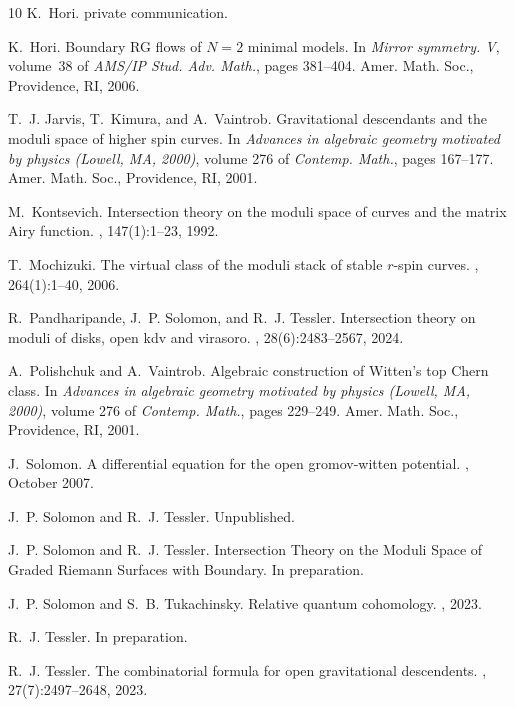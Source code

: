 \documentclass[11pt]{amsart}
\theoremstyle{definition}
\theoremstyle{remark}
\newcommand{\<}{\left<}
\renewcommand{\>}{\right>}
\numberwithin{equation}{section}
\begin{document}
\begin{thebibliography}{10}
K.~Hori.
\newblock private communication.

K.~Hori.
\newblock Boundary {RG} flows of {$N=2$} minimal models.
\newblock In {\em Mirror symmetry. {V}}, volume~38 of {\em AMS/IP Stud. Adv.
  Math.}, pages 381--404. Amer. Math. Soc., Providence, RI, 2006.

T.~J. Jarvis, T.~Kimura, and A.~Vaintrob.
\newblock Gravitational descendants and the moduli space of higher spin curves.
\newblock In {\em Advances in algebraic geometry motivated by physics
  ({L}owell, {MA}, 2000)}, volume 276 of {\em Contemp. Math.}, pages 167--177.
  Amer. Math. Soc., Providence, RI, 2001.

M.~Kontsevich.
\newblock Intersection theory on the moduli space of curves and the matrix
  {A}iry function.
, 147(1):1--23, 1992.

T.~Mochizuki.
\newblock The virtual class of the moduli stack of stable {$r$}-spin curves.
, 264(1):1--40, 2006.

R.~Pandharipande, J.~P. Solomon, and R.~J. Tessler.
\newblock Intersection theory on moduli of disks, open kdv and virasoro.
, 28(6):2483--2567, 2024.

A.~Polishchuk and A.~Vaintrob.
\newblock Algebraic construction of {W}itten's top {C}hern class.
\newblock In {\em Advances in algebraic geometry motivated by physics
  ({L}owell, {MA}, 2000)}, volume 276 of {\em Contemp. Math.}, pages 229--249.
  Amer. Math. Soc., Providence, RI, 2001.

J.~Solomon.
\newblock A differential equation for the open gromov-witten potential.
, October 2007.

J.~P. Solomon and R.~J. Tessler.
\newblock Unpublished.

J.~P. Solomon and R.~J. Tessler.
\newblock Intersection {T}heory on the {M}oduli {S}pace of {G}raded {R}iemann
  {S}urfaces with {B}oundary.
\newblock In preparation.

J.~P. Solomon and S.~B. Tukachinsky.
\newblock Relative quantum cohomology.
, 2023.

R.~J. Tessler.
\newblock In preparation.

R.~J. Tessler.
\newblock The combinatorial formula for open gravitational descendents.
, 27(7):2497--2648, 2023.


\end{thebibliography}
\end{document}
